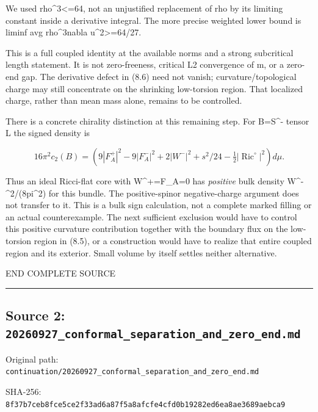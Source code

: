 \documentclass[
  10pt,
]{article}
\begin{document}
We used rho\^{}3\textless=64, not an unjustified replacement of rho by
its limiting constant inside a derivative integral. The more precise
weighted lower bound is liminf avg rho\^{}3\textbar nabla
u\textbar\^{}2\textgreater=64/27.

This is a full coupled identity at the available norms and a strong
subcritical length statement. It is not zero-freeness, critical L2
convergence of m, or a zero-end gap. The derivative defect in (8.6) need
not vanish; curvature/topological charge may still concentrate on the
shrinking low-torsion region. That localized charge, rather than mean
mass alone, remains to be controlled.

There is a concrete chirality distinction at this remaining step. For
B=S\^{}- tensor L the signed density is

\[
 16\pi^2c_2(B)=
 \left(9|F_A^+|^2-9|F_A^-|^2
       +2|W^-|^2+s^2/24-\tfrac12|\operatorname{Ric}^{\circ}|^2\right)d\mu.
                                                               \tag{8.12}
\]

Thus an ideal Ricci-flat core with W\^{}+=F\_A=0 has \emph{positive}
bulk density \textbar W\^{}-\textbar\^{}2/(8pi\^{}2) for this bundle.
The positive-spinor negative-charge argument does not transfer to it.
This is a bulk sign calculation, not a complete marked filling or an
actual counterexample. The next sufficient exclusion would have to
control this positive curvature contribution together with the boundary
flux on the low-torsion region in (8.5), or a construction would have to
realize that entire coupled region and its exterior. Small volume by
itself settles neither alternative.

END COMPLETE SOURCE

\begin{center}\rule{0.5\linewidth}{0.5pt}\end{center}

\hypertarget{source-2-20260927_conformal_separation_and_zero_end.md}{%
\subsection{Source 2:
\nolinkurl{20260927_conformal_separation_and_zero_end.md}}\label{source-2-20260927_conformal_separation_and_zero_end.md}}

Original path:
\nolinkurl{continuation/20260927_conformal_separation_and_zero_end.md}

SHA-256:
\nolinkurl{8f37b7ceb8fce5ce2f33ad6a87f5a8afcfe4cfd0b19282ed6ea8ae3689aebca9}
\end{document}
